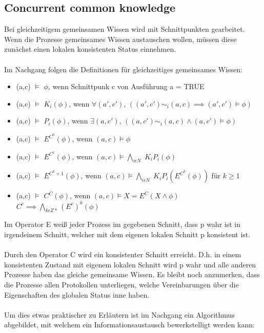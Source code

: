 \subsection{Concurrent common knowledge}
\label{concurrent_comm_know}
Bei gleichzeitigem gemeinsamen Wissen wird mit Schnittpunkten gearbeitet. Wenn die Prozesse gemeinsames Wissen austauschen wollen, müssen diese zunächst einen lokalen konsistenten Status einnehmen. \\\\
Im Nachgang folgen die Definitionen für gleichzeitiges gemeinsames Wissen:
	\begin{itemize}
			\item (a,c)	$\models$ $\phi$, wenn Schnittpunk c von Ausführung a = TRUE
			\item (a,c)	$\models$ $K_i(\phi)$, wenn $\forall(a',c')$, $((a',c') \sim_i (a,c) \implies (a',c') \models \phi)$
			\item (a,c)	$\models$ $P_i(\phi)$, wenn $\exists(a,c')$, $((a,c') \sim_i (a,c) \wedge (a,c') \models \phi)$
			\item (a,c)	$\models$ $E^{C^0}(\phi)$, wenn $(a,c) \models \phi$
			\item (a,c)	$\models$ $E^{C^1}(\phi)$, wenn $(a,c) \models \bigwedge_{i\epsilon N}\; K_i P_i(\phi)$
			\item (a,c)	$\models$ $E^{C^k+1}(\phi)$, wenn $(a,c) \models \bigwedge_{i\epsilon N}\; K_i P_i(E^{C^k}(\phi))$ für $k \geq 1$
			\item (a,c)	$\models$ $C^C(\phi)$, wenn $(a,c) \models X = E^C(X \wedge \phi)$ 
			$C^c \implies \bigwedge_{k\epsilon Z*}(E^c)^k(\phi) $ 
		\end{itemize}
Im Operator E weiß jeder Prozess im gegebenen Schnitt, dass p wahr ist in irgendeinem Schnitt, welcher mit dem eigenen lokalen Schnitt p konsistent ist. \\\\ 
Durch den Operator C wird ein konsistenter Schnitt erreicht. D.h. in einem konsistenten Zustand mit eigenem lokalen Schnitt wird p wahr und alle anderen Prozesse haben das gleiche gemeinsame Wissen. Es bleibt noch anzumerken, dass die Prozesse allen Protokollen unterliegen, welche Vereinbarungen über die Eigenschaften des globalen Status inne haben. \\\\
Um dies etwas praktischer zu Erläutern ist im Nachgang ein Algorithmus abgebildet, mit welchem ein Informationsaustausch bewerkstelligt werden kann: 

